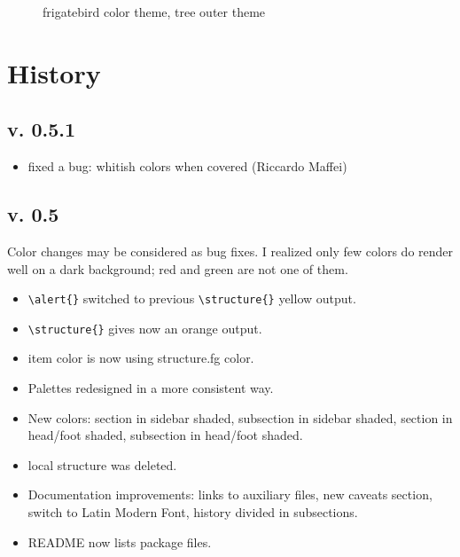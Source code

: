 \documentclass[12pt]{article}
\begin{document}
\begin{figure}[h!]
   \caption{frigatebird color theme, tree outer theme}  
   \label{fig:frigatebird-tree}
\end{figure}

\newpage

\section{History}

\subsection*{v. 0.5.1}


\begin{itemize}
   \item fixed a bug: whitish colors when covered (Riccardo Maffei)
\end{itemize}

\subsection*{v. 0.5}

Color changes may be considered as bug fixes. I realized only few colors do render well on a dark background; red and green are not one of them.
\begin{itemize}
   \item \verb+\alert{}+ switched to previous \verb+\structure{}+ yellow output.
   \item \verb+\structure{}+ gives now an orange output.
   \item \ttfamily{}item\rmfamily{} color is now using \ttfamily{}structure.fg\rmfamily{} color.
   \item Palettes redesigned in a more consistent way.
   \item New colors: \ttfamily{} section in sidebar shaded\rmfamily{},\ttfamily{} subsection in sidebar shaded\rmfamily{},\ttfamily{} section in head/foot shaded\rmfamily{},\ttfamily{} subsection in head/foot shaded\rmfamily{}.
   \item \ttfamily{}local structure\rmfamily{} was deleted.
   \item Documentation improvements: links to auxiliary files, new caveats section, switch to Latin Modern Font, history divided in subsections.
   \item README now lists package files.
\end{itemize}
\end{document}

